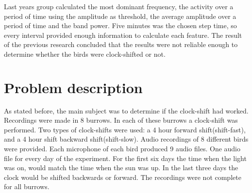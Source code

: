 \documentclass[a4paper]{article}
\begin{document}
Last years group calculated the most dominant frequency, the activity over a period of time using the amplitude as threshold, the average amplitude over a period of time and the band power. Five minutes was the chosen step time, so every interval provided enough information to calculate each feature. The result of the previous research concluded that the results were not reliable enough to determine whether the birds were clock-shifted or not.


\section*{Problem description}
As stated before, the main subject was to determine if the clock-shift had worked. Recordings were made in 8 burrows. In each of these burrows a clock-shift was performed. Two types of clock-shifts were used: a 4 hour forward shift(shift-fast), and a 4 hour shift backward shift(shift-slow). Audio recordings of 8 different birds were provided. Each microphone of each bird produced 9 audio files. One audio file for every day of the experiment. For the first six days the time when the light was on, would match the time when the sun was up. In the last three days the clock would be shifted backwards or forward. The recordings were not complete for all burrows.
\end{document}
